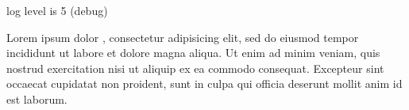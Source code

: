 \documentclass{article}
\begin{document}
{log level is 5 (debug)}

Lorem ipsum dolor , consectetur adipisicing elit, sed do
eiusmod tempor incididunt ut labore et dolore magna aliqua. Ut enim ad
minim veniam, quis nostrud exercitation  nisi ut
aliquip ex ea commodo consequat.  Excepteur sint occaecat cupidatat non proident, sunt in culpa
qui officia deserunt mollit anim id est laborum.
\end{document}
